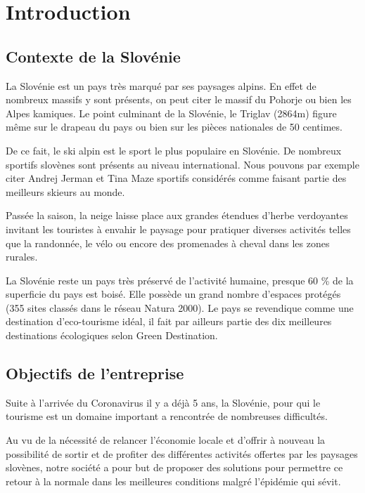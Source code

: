 {\chapter{Introduction}

\section{Contexte de la Slovénie}
La Slovénie est un pays très marqué par ses paysages alpins. En effet de nombreux massifs y sont présents, on peut citer le massif du Pohorje ou bien les Alpes kamiques. Le point culminant de la Slovénie, le Triglav (2864m) figure même sur le drapeau du pays ou bien sur les pièces nationales de 50 centimes.\n

De ce fait, le ski alpin est le sport le plus populaire en Slovénie. De nombreux sportifs slovènes sont présents au niveau international. Nous pouvons par exemple citer Andrej Jerman et Tina Maze sportifs considérés comme faisant partie des meilleurs skieurs au monde.\n

Passée la saison, la neige laisse place aux grandes étendues d'herbe verdoyantes invitant les touristes à envahir le paysage pour pratiquer diverses activités telles que la randonnée, le vélo ou encore des promenades à cheval dans les zones rurales.\n

La Slovénie reste un pays très préservé de l'activité humaine, presque 60 \% de la superficie du pays est boisé. Elle possède un grand nombre d'espaces protégés (355 sites classés dans le réseau Natura 2000). Le pays se revendique comme une destination d'eco-tourisme idéal, il fait  par ailleurs partie des dix meilleures destinations écologiques selon Green Destination. \n






\section{Objectifs de l'entreprise}

Suite à l'arrivée du Coronavirus il y a déjà 5 ans, la Slovénie, pour qui le tourisme est un domaine important a rencontrée de nombreuses difficultés. \n 

Au vu de la nécessité de relancer l'économie locale et d'offrir à nouveau la possibilité de sortir et de profiter des différentes activités offertes par les paysages slovènes, notre société a pour but de proposer des solutions pour permettre ce retour à la normale dans les meilleures conditions malgré l'épidémie qui sévit.\n

}
